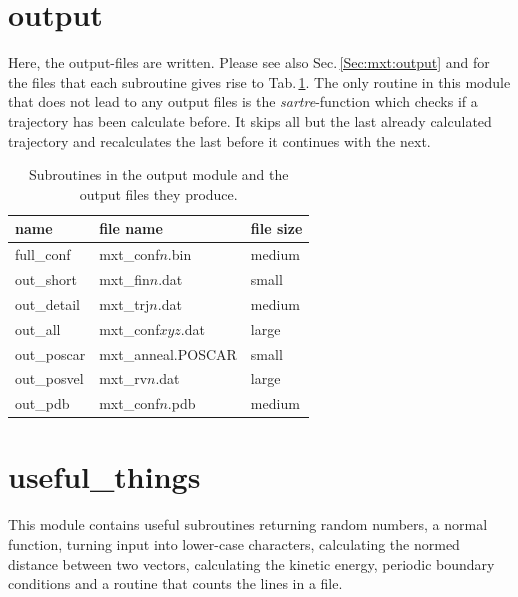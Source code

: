 \documentclass[twoside, 11pt, titlepage, captions=nooneline, a4paper, headsepline]{scrbook}%
\begin{document}
\section{output}
Here, the output-files are written. Please see also Sec.\,\ref{Sec:mxt:output} and for the files that each subroutine gives rise to Tab.\,\ref{Tab:Funct:output}. The only routine in this module that does not lead to any output files is the \textit{sartre}-function which checks if a trajectory has been calculate before. It skips all but the last already calculated trajectory and recalculates the last before it continues with the next.

\begin{table}[b!]
\centering
\caption{Subroutines in the output module and the output files they produce.}
\label{Tab:Funct:output}
\begin{tabular}{lll}
\hline\hline
name			&file name			& file size\\
\hline
full\_conf		&mxt\_conf$n$.bin	&medium\\
out\_short		&mxt\_fin$n$.dat 	&small\\
out\_detail		&mxt\_trj$n$.dat	&medium\\
out\_all		&mxt\_conf$xyz$.dat	&large\\
out\_poscar		&mxt\_anneal.POSCAR	&small\\
out\_posvel		&mxt\_rv$n$.dat		&large\\
out\_pdb		&mxt\_conf$n$.pdb	&medium\\
\hline
\hline
\end{tabular}
\end{table}

\section{useful\_things}
This module contains useful subroutines returning random numbers, a normal function, turning input into lower-case characters, calculating the normed distance between two vectors, calculating the kinetic energy, periodic boundary conditions and a routine that counts the lines in a file.

\printindex
\end{document}
